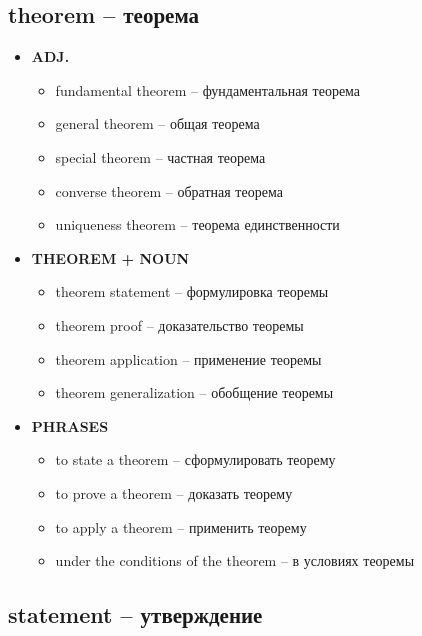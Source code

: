 \documentclass[a4paper, 10pt]{article}
\theoremstyle{definition}
\theoremstyle{plain}
\theoremstyle{remark}
\begin{document}
\subsection{theorem – теорема}

\begin{itemize}
    \item \textbf{ADJ.}
    \begin{itemize}
        \item fundamental theorem – фундаментальная теорема
        \item general theorem – общая теорема
        \item special theorem – частная теорема
        \item converse theorem – обратная теорема
        \item uniqueness theorem – теорема единственности
    \end{itemize}
    
    \item \textbf{THEOREM + NOUN}
    \begin{itemize}
        \item theorem statement – формулировка теоремы
        \item theorem proof – доказательство теоремы
        \item theorem application – применение теоремы
        \item theorem generalization – обобщение теоремы
    \end{itemize}
    
    \item \textbf{PHRASES}
    \begin{itemize}
        \item to state a theorem – сформулировать теорему
        \item to prove a theorem – доказать теорему
        \item to apply a theorem – применить теорему
        \item under the conditions of the theorem – в условиях теоремы
    \end{itemize}
\end{itemize}

\subsection{statement – утверждение}
\end{document}

